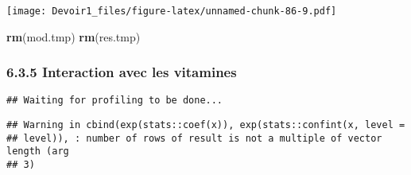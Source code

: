 \documentclass[]{article}
\newenvironment{Shaded}{\begin{snugshade}}{\end{snugshade}}
\newcommand{\KeywordTok}[1]{\textcolor[rgb]{0.13,0.29,0.53}{\textbf{#1}}}
\newcommand{\DataTypeTok}[1]{\textcolor[rgb]{0.13,0.29,0.53}{#1}}
\newcommand{\DecValTok}[1]{\textcolor[rgb]{0.00,0.00,0.81}{#1}}
\newcommand{\StringTok}[1]{\textcolor[rgb]{0.31,0.60,0.02}{#1}}
\newcommand{\OperatorTok}[1]{\textcolor[rgb]{0.81,0.36,0.00}{\textbf{#1}}}
\newcommand{\NormalTok}[1]{#1}
\begin{document}
\texttt{[image: Devoir1\_files/figure-latex/unnamed-chunk-86-9.pdf]}

\begin{Shaded}
\begin{Highlighting}[]
\KeywordTok{rm}\NormalTok{(mod.tmp)}
\KeywordTok{rm}\NormalTok{(res.tmp)}
\end{Highlighting}
\end{Shaded}

\subsubsection{6.3.5 Interaction avec les
vitamines}\label{interaction-avec-les-vitamines}

\begin{Shaded}
\end{Shaded}

\begin{verbatim}
## Waiting for profiling to be done...
\end{verbatim}

\begin{verbatim}
## Warning in cbind(exp(stats::coef(x)), exp(stats::confint(x, level =
## level)), : number of rows of result is not a multiple of vector length (arg
## 3)
\end{verbatim}
\end{document}
